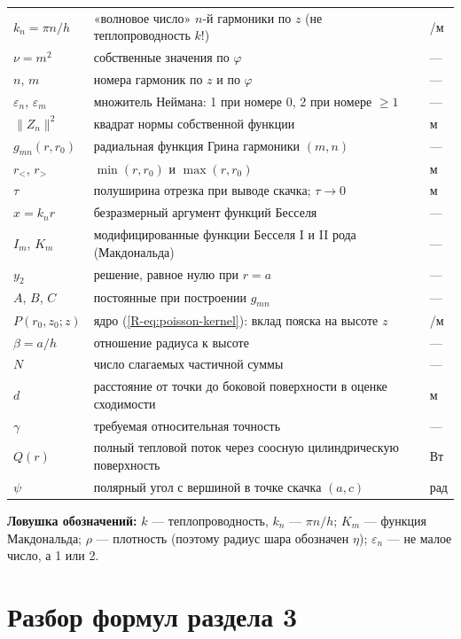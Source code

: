 \documentclass[a4paper,12pt]{article}
\renewcommand{\ge}{\geqslant}
\newcommand{\rf}[1]{(\ref*{R-#1})}
\begin{document}
\begin{longtable}{@{}>{\raggedright\arraybackslash}p{2.8cm}>{\raggedright\arraybackslash}p{10.9cm}>{\raggedright\arraybackslash}p{2.2cm}@{}}
$k_n=\pi n/h$ & «волновое число» $n$-й гармоники по $z$ (не теплопроводность $k$!) & 1/м \\
$\nu=m^2$ & собственные значения по $\varphi$ & — \\
$n$, $m$ & номера гармоник по $z$ и по $\varphi$ & — \\
$\varepsilon_n$, $\varepsilon_m$ & множитель Неймана: 1 при номере 0, 2 при номере $\ge1$ & — \\
$\|Z_n\|^2$ & квадрат нормы собственной функции & м \\
$g_{mn}(r,r_0)$ & радиальная функция Грина гармоники $(m,n)$ & — \\
$r_<$, $r_>$ & $\min(r,r_0)$ и $\max(r,r_0)$ & м \\
$\tau$ & полуширина отрезка при выводе скачка; $\tau\to0$ & м \\
$x=k_nr$ & безразмерный аргумент функций Бесселя & — \\
$I_m$, $K_m$ & модифицированные функции Бесселя I и II рода (Макдональда) & — \\
$y_2$ & решение, равное нулю при $r=a$ & — \\
$A$, $B$, $C$ & постоянные при построении $g_{mn}$ & — \\
$P(r_0,z_0;z)$ & ядро \rf{eq:poisson-kernel}: вклад пояска на высоте $z$ & 1/м \\
$\beta=a/h$ & отношение радиуса к высоте & — \\
$N$ & число слагаемых частичной суммы & — \\
$d$ & расстояние от точки до боковой поверхности в оценке сходимости & м \\
$\gamma$ & требуемая относительная точность & — \\
$Q(r)$ & полный тепловой поток через соосную цилиндрическую поверхность & Вт \\
$\psi$ & полярный угол с вершиной в точке скачка $(a,c)$ & рад \\
\bottomrule
\end{longtable}

\textbf{Ловушка обозначений:} $k$ — теплопроводность, $k_n$ — $\pi n/h$;
$K_m$ — функция Макдональда; $\rho$ — плотность (поэтому радиус шара
обозначен $\eta$); $\varepsilon_n$ — не малое число, а 1 или 2.

\section{Разбор формул раздела 3}
\label{sec:formulas}
\end{document}
